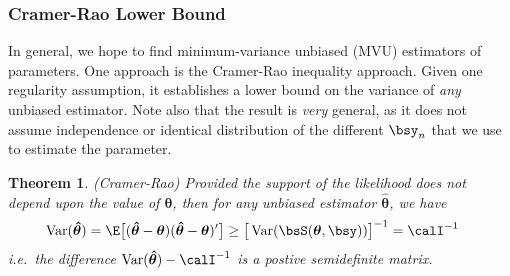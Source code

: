 \documentclass[12pt]{article}
\theoremstyle{plain}
\newtheorem{thm}{Theorem}[section]
\theoremstyle{definition}
\theoremstyle{remark}
\newcommand{\bstheta}{\boldsymbol{\theta}}
\newcommand{\bshattheta}{\boldsymbol{\hat{\theta}}}
\newcommand{\Var}{\operatorname{Var}}
\begin{document}
\clearpage
\subsubsection{Cramer-Rao Lower Bound}

In general, we hope to find minimum-variance unbiased (MVU) estimators
of parameters. One approach is the Cramer-Rao inequality approach.
Given one regularity assumption, it establishes a lower bound on the
variance of \emph{any} unbiased estimator.
Note also that the result is \emph{very} general, as it does not assume
independence or identical distribution of the different $\bsy_n$ that we
use to estimate the parameter.

\begin{thm}\emph{(Cramer-Rao)}
Provided the support of the likelihood does \emph{not} depend upon the
value of $\bstheta$, then for \emph{any} unbiased estimator
$\bshattheta$, we have
\begin{align*}
  \Var(\bshattheta)
  =
  \E\big[ (\bshattheta-\bstheta) (\bshattheta-\bstheta)' \big]
  &\geq
  \big[\Var(\bsS(\bstheta,\bsy))\big]^{-1}
  =
  \calI^{-1}
\end{align*}
i.e.\ the difference $\Var(\bshattheta)-\calI^{-1}$ is a postive
semidefinite matrix.
\end{thm}
\end{document}
